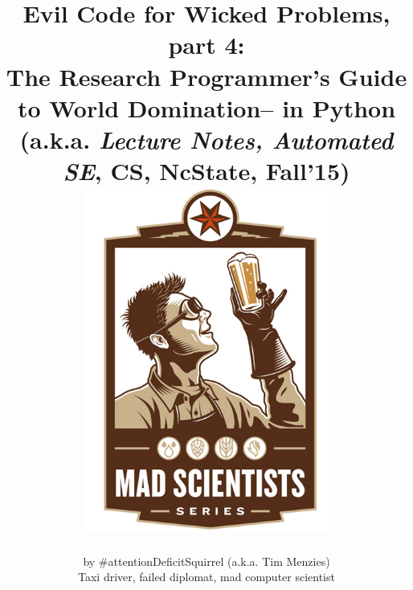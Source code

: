 \documentclass[9pt,twocolumn]{article}
\date{}
\begin{document}
 


\onecolumn
\title{{\bf Evil Code for Wicked Problems, part 4:\\
    The Research Programmer's Guide to World Domination-- in Python\\
  (a.k.a. {\em Lecture Notes, Automated
  SE}, CS, NcState, Fall'15)}\\
 \includegraphics[width=3.2in]{img/six.jpg}}
\author{by \#attentionDeficitSquirrel (a.k.a. Tim Menzies)
  \\Taxi driver, failed diplomat, mad computer scientist }

\maketitle
\end{document}
